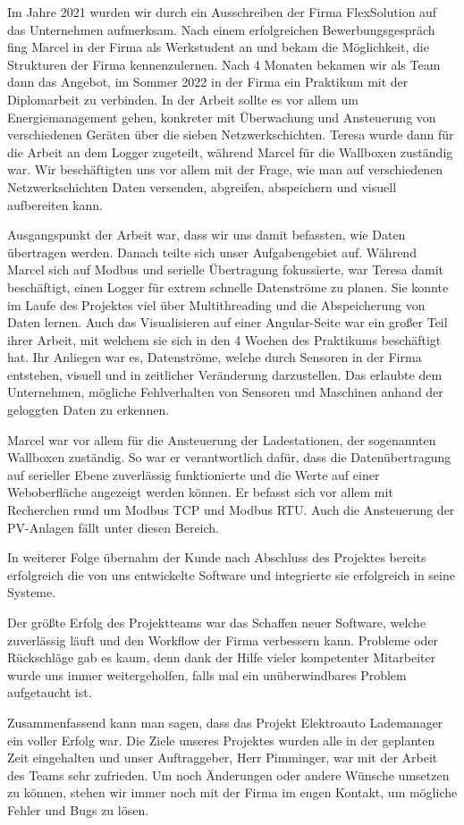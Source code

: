 
Im Jahre 2021 wurden wir durch ein Ausschreiben der Firma FlexSolution auf das Unternehmen aufmerksam. Nach einem erfolgreichen Bewerbungsgespräch fing Marcel in der Firma als Werkstudent an und bekam die Möglichkeit, die Strukturen der Firma kennenzulernen. Nach 4 Monaten bekamen wir als Team dann das Angebot, im Sommer 2022 in der Firma ein Praktikum mit der Diplomarbeit zu verbinden. In der Arbeit sollte es vor allem um Energiemanagement gehen, konkreter mit Überwachung und Ansteuerung von verschiedenen Geräten über die sieben Netzwerkschichten. Teresa wurde dann für die Arbeit an dem Logger zugeteilt, während Marcel für die Wallboxen zuständig war. Wir beschäftigten uns vor allem mit der Frage, wie man auf verschiedenen Netzwerkschichten Daten versenden, abgreifen, abspeichern und visuell aufbereiten kann.




Ausgangspunkt der Arbeit war, dass wir uns damit befassten, wie Daten übertragen werden. Danach teilte sich unser Aufgabengebiet auf. Während Marcel sich auf Modbus und serielle Übertragung fokussierte, war Teresa damit beschäftigt, einen Logger für extrem schnelle Datenströme zu planen. Sie konnte im Laufe des Projektes viel über Multithreading und die Abspeicherung von Daten lernen. Auch das Visualisieren auf einer Angular-Seite war ein großer Teil ihrer Arbeit, mit welchem sie sich in den 4 Wochen des Praktikums beschäftigt hat. Ihr Anliegen war es, Datenströme, welche durch Sensoren in der Firma entstehen, visuell und in zeitlicher Veränderung darzustellen. Das erlaubte dem Unternehmen, mögliche Fehlverhalten von Sensoren und Maschinen anhand der geloggten Daten zu erkennen.



Marcel war vor allem für die Ansteuerung der Ladestationen, der sogenannten Wallboxen zuständig. So war er verantwortlich dafür, dass die Datenübertragung auf serieller Ebene zuverlässig funktionierte und die Werte auf einer Weboberfläche angezeigt werden können. Er befasst sich vor allem mit Recherchen rund um Modbus TCP und Modbus RTU. Auch die Ansteuerung der PV-Anlagen fällt unter diesen Bereich.


In weiterer Folge übernahm der Kunde nach Abschluss des Projektes bereits erfolgreich die von uns entwickelte Software und integrierte sie erfolgreich in seine Systeme.


Der größte Erfolg des Projektteams war das Schaffen neuer Software, welche zuverlässig läuft und den Workflow der Firma verbessern kann. Probleme oder Rückschläge gab es kaum, denn dank der Hilfe vieler kompetenter Mitarbeiter wurde uns immer weitergeholfen, falls mal ein unüberwindbares Problem aufgetaucht ist.


Zusammenfassend kann man sagen, dass das Projekt \glqq Elektroauto Lademanager\grqq{} ein voller Erfolg war. Die Ziele unseres Projektes wurden alle in der geplanten Zeit eingehalten und unser Auftraggeber, Herr Pimminger, war mit der Arbeit des Teams sehr zufrieden. Um noch Änderungen oder andere Wünsche umsetzen zu können, stehen wir immer noch mit der Firma im engen Kontakt, um mögliche Fehler und Bugs zu lösen.